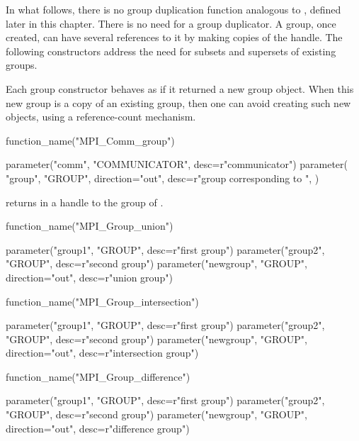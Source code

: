 \begin{rationale}
In what follows, there is no group duplication function analogous to
, defined later in this chapter. There is no need for
a group duplicator. A group, once created, can have several references to it
by making copies of the handle. The following constructors address the need
for subsets and supersets of existing groups.
\end{rationale}

\begin{implementors}
Each group constructor behaves as if it returned a new group object.
When this new group is a copy of an existing group, then
one can avoid creating such new objects, using
a reference-count mechanism.
\end{implementors}

%
%
\begin{mpi-binding}
    function_name("MPI_Comm_group")
    
    parameter("comm", "COMMUNICATOR", desc=r"communicator")
    parameter(
        "group",
        "GROUP",
        direction="out",
        desc=r"group corresponding to ",
    )
\end{mpi-binding}

 returns in  a handle to the
group of .

%
\begin{mpi-binding}
    function_name("MPI_Group_union")
    
    parameter("group1", "GROUP", desc=r"first group")
    parameter("group2", "GROUP", desc=r"second group")
    parameter("newgroup", "GROUP", direction="out", desc=r"union group")
\end{mpi-binding}

%
\begin{mpi-binding}
    function_name("MPI_Group_intersection")
    
    parameter("group1", "GROUP", desc=r"first group")
    parameter("group2", "GROUP", desc=r"second group")
    parameter("newgroup", "GROUP", direction="out", desc=r"intersection group")
\end{mpi-binding}

%
\begin{mpi-binding}
    function_name("MPI_Group_difference")
    
    parameter("group1", "GROUP", desc=r"first group")
    parameter("group2", "GROUP", desc=r"second group")
    parameter("newgroup", "GROUP", direction="out", desc=r"difference group")
\end{mpi-binding}

